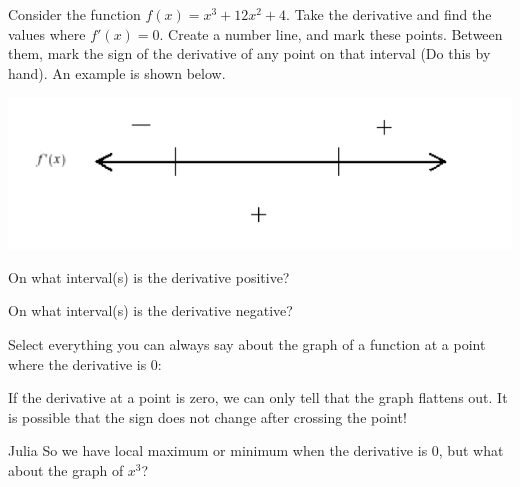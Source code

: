 \documentclass{ximera}
\begin{document}
\begin{question}
Consider the function $f(x)=x^3+12x^2+4$.
Take the derivative and find the values where $f'(x)=0$. Create a number line, and mark these points. Between them, mark the sign of the derivative of any point on that interval (Do this by hand). An example is shown below.

\begin{image}
\includegraphics{ExampleNumberline}
\end{image}

On what interval(s) is the derivative positive?

\begin{selectAll}
\choice{$[-8, 0)$}
\choice{$(-\infty, 0]$}
\end{selectAll}

On what interval(s) is the derivative negative?

\begin{selectAll}
\choice{$[-4, \infty)$}
\choice{$(-\infty, 0]$}
\end{selectAll}

Select everything you can always say about the graph of a function at a point where the derivative is 0:

\begin{selectAll}
\end{selectAll}
\begin{feedback}[correct]
If the derivative at a point is zero, we can only tell that the graph flattens out. It is possible that the sign does not change after crossing the point!
\end{feedback}
\end{question}

\begin{dialogue}
\item[Julia] So we have local maximum or minimum when the derivative is 0, but what about the graph of $x^3$?
\end{dialogue}
\end{document}
